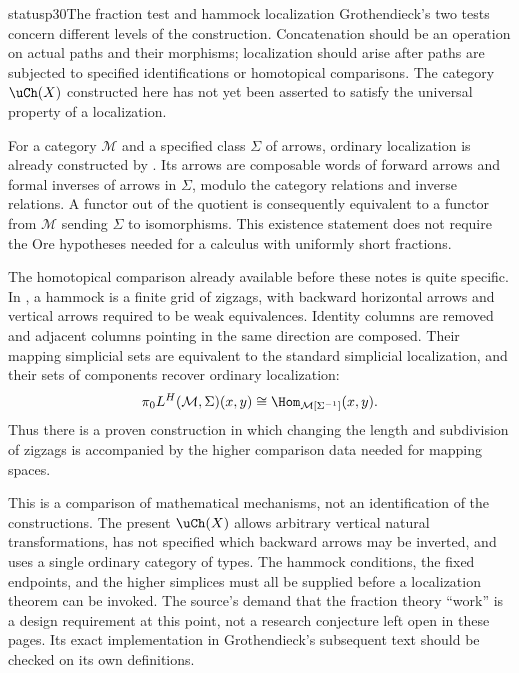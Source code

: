 \begin{dcomment}{status}{p30}{The fraction test and hammock localization}
Grothendieck's two tests concern different levels of the construction. Concatenation should be an operation on actual paths and their morphisms; localization should arise after paths are subjected to specified identifications or homotopical comparisons. The category $\uCh(X)$ constructed here has not yet been asserted to satisfy the universal property of a localization.

For a category $\mathcal M$ and a specified class $\Sigma$ of arrows, ordinary localization is already constructed by \citet[Chapter~I, \S1.1 and Lemma~1.2]{GabrielZisman1967}. Its arrows are composable words of forward arrows and formal inverses of arrows in $\Sigma$, modulo the category relations and inverse relations. A functor out of the quotient is consequently equivalent to a functor from $\mathcal M$ sending $\Sigma$ to isomorphisms. This existence statement does not require the Ore hypotheses needed for a calculus with uniformly short fractions.

The homotopical comparison already available before these notes is quite specific. In \citet[Definition~2.1 and Propositions~2.2 and~3.1]{DwyerKan1980Calculating}, a hammock is a finite grid of zigzags, with backward horizontal arrows and vertical arrows required to be weak equivalences. Identity columns are removed and adjacent columns pointing in the same direction are composed. Their mapping simplicial sets are equivalent to the standard simplicial localization, and their sets of components recover ordinary localization:
\[
 \pi_0L^H(\mathcal M,\Sigma)(x,y)
   \cong\Hom_{\mathcal M[\Sigma^{-1}]}(x,y).
\]
Thus there is a proven construction in which changing the length and subdivision of zigzags is accompanied by the higher comparison data needed for mapping spaces.

This is a comparison of mathematical mechanisms, not an identification of the constructions. The present $\uCh(X)$ allows arbitrary vertical natural transformations, has not specified which backward arrows may be inverted, and uses a single ordinary category of types. The hammock conditions, the fixed endpoints, and the higher simplices must all be supplied before a localization theorem can be invoked. The source's demand that the fraction theory ``work'' is a design requirement at this point, not a research conjecture left open in these pages. Its exact implementation in Grothendieck's subsequent text should be checked on its own definitions.
\end{dcomment}

